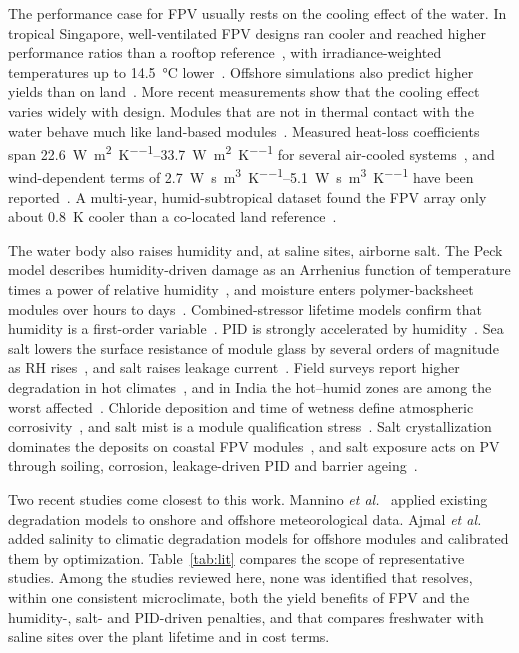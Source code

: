 \documentclass[journal]{IEEEtran}
\begin{document}
The performance case for FPV usually rests on the cooling effect of the water. In tropical Singapore, well-ventilated
FPV designs ran cooler and reached higher performance ratios than a rooftop reference~\cite{liu2018}, with
irradiance-weighted temperatures up to \SI{14.5}{\celsius} lower~\cite{dorenkamper2021}. Offshore simulations also
predict higher yields than on land~\cite{golroodbari2020}. More recent measurements show that the cooling effect varies
widely with design. Modules that are not in thermal contact with the water behave much like land-based
modules~\cite{lindholm2021}. Measured heat-loss coefficients span \SIrange{22.6}{33.7}{\watt\per\square\metre\per\kelvin}
for several air-cooled systems~\cite{nysted2024,wu2024}, and wind-dependent terms of
\SIrange{2.7}{5.1}{\watt\second\per\cubic\metre\per\kelvin} have been reported~\cite{dorenkamper2024}. A multi-year,
humid-subtropical dataset found the FPV array only about \SI{0.8}{\kelvin} cooler than a co-located land
reference~\cite{firat2026}.

The water body also raises humidity and, at saline sites, airborne salt. The Peck model describes humidity-driven damage
as an Arrhenius function of temperature times a power of relative humidity~\cite{peck1986}, and moisture enters
polymer-backsheet modules over hours to days~\cite{kempe2006}. Combined-stressor lifetime models confirm that humidity
is a first-order variable~\cite{kaaya2019}. PID is strongly accelerated by humidity~\cite{pingel2010,hacke2011,
hoffmann2014,luo2017,bora2021}. Sea salt lowers the surface resistance of module glass by several orders of magnitude
as RH rises~\cite{hacke2015}, and salt raises leakage current~\cite{islam2018}. Field surveys report higher
degradation in hot climates~\cite{jordan2013}, and in India the hot--humid zones are among the worst
affected~\cite{dubey2014}. Chloride deposition and time of wetness define atmospheric corrosivity~\cite{iso9223}, and
salt mist is a module qualification stress~\cite{iec61701}. Salt crystallization dominates the deposits on coastal FPV
modules~\cite{ahmad2026}, and salt exposure acts on PV through soiling, corrosion, leakage-driven PID and barrier
ageing~\cite{goharian2026}.

Two recent studies come closest to this work. Mannino \emph{et al.}~\cite{mannino2023} applied existing degradation
models to onshore and offshore meteorological data. Ajmal \emph{et al.}~\cite{ajmal2025} added salinity to climatic
degradation models for offshore modules and calibrated them by optimization. Table~\ref{tab:lit} compares the scope of
representative studies. Among the studies reviewed here, none was identified that resolves, within one consistent
microclimate, both the yield benefits of FPV and the humidity-, salt- and PID-driven penalties, and that compares
freshwater with saline sites over the plant lifetime and in cost terms.
\end{document}

